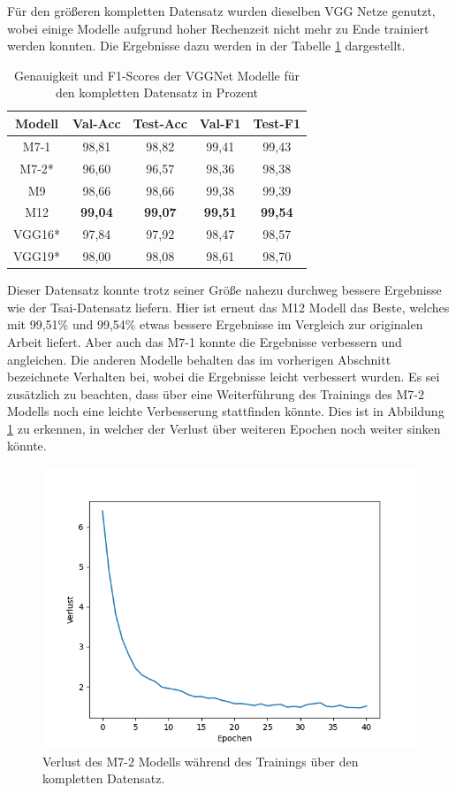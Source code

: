 \documentclass[twoside,a4paper]{IEEEtran}
\begin{document}
Für den größeren kompletten Datensatz wurden dieselben VGG Netze genutzt, wobei einige Modelle aufgrund hoher Rechenzeit nicht mehr zu Ende trainiert werden konnten. Die Ergebnisse dazu werden in der Tabelle \ref{vgg_ergebnis_full} dargestellt.
\begin{table}[!htb]
	\caption{Genauigkeit und F1-Scores der VGGNet Modelle für den kompletten Datensatz in Prozent}
	\label{vgg_ergebnis_full}
	\centering
	\begin{tabular}{|c|c|c|c|c|}
		\hline
		Modell & Val-Acc & Test-Acc & Val-F1 & Test-F1\\
		\hline 
		\hline 
		M7-1 & 98,81 & 98,82 & 99,41 & 99,43\\
		\hline
		M7-2* & 96,60 & 96,57 & 98,36 & 98,38\\
		\hline
		M9 & 98,66 & 98,66 & 99,38 & 99,39\\
		\hline 
		M12 & \textbf{99,04} & \textbf{99,07} & \textbf{99,51} & \textbf{99,54}\\
		\hline 
		VGG16* & 97,84 & 97,92 & 98,47 & 98,57\\
		\hline 
		VGG19* & 98,00 & 98,08 & 98,61 & 98,70\\
		\hline 
	\end{tabular}
\end{table}

Dieser Datensatz konnte trotz seiner Größe nahezu durchweg bessere Ergebnisse wie der Tsai-Datensatz liefern. Hier ist erneut das M12 Modell das Beste, welches mit 99,51\% und 99,54\% etwas bessere Ergebnisse im Vergleich zur originalen Arbeit liefert. Aber auch das M7-1 konnte die Ergebnisse verbessern und angleichen. Die anderen Modelle behalten das im vorherigen Abschnitt bezeichnete Verhalten bei, wobei die Ergebnisse leicht verbessert wurden. Es sei zusätzlich zu beachten, dass über eine Weiterführung des Trainings des M7-2 Modells noch eine leichte Verbesserung stattfinden könnte. Dies ist in Abbildung \ref{loss} zu erkennen, in welcher der Verlust über weiteren Epochen noch weiter sinken könnte.

\begin{figure}[!htb]
	\centering
	\includegraphics[width=\columnwidth]{loss}
	\caption{Verlust des M7-2 Modells während des Trainings über den kompletten Datensatz.}
	\label{loss}
\end{figure}
\end{document}
